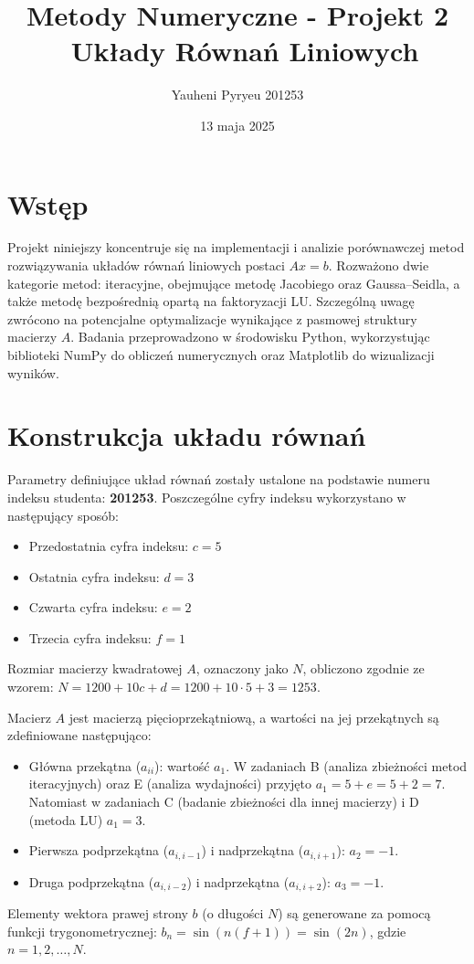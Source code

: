 \documentclass[a4paper, 11pt]{article}
\title{Metody Numeryczne - Projekt 2 \ Układy Równań Liniowych}
\author{Yauheni Pyryeu 201253}
\date{13 maja 2025}
\begin{document}
\maketitle

\section{Wstęp}
Projekt niniejszy koncentruje się na implementacji i analizie porównawczej metod rozwiązywania układów równań liniowych postaci $Ax = b$. Rozważono dwie kategorie metod: iteracyjne, obejmujące metodę Jacobiego oraz Gaussa–Seidla, a także metodę bezpośrednią opartą na faktoryzacji LU. Szczególną uwagę zwrócono na potencjalne optymalizacje wynikające z pasmowej struktury macierzy $A$. Badania przeprowadzono w środowisku Python, wykorzystując biblioteki NumPy do obliczeń numerycznych oraz Matplotlib do wizualizacji wyników.

\section{Konstrukcja układu równań}
Parametry definiujące układ równań zostały ustalone na podstawie numeru indeksu studenta: \textbf{201253}. Poszczególne cyfry indeksu wykorzystano w następujący sposób:
\begin{itemize}
    \item Przedostatnia cyfra indeksu: $c = 5$
    \item Ostatnia cyfra indeksu: $d = 3$
    \item Czwarta cyfra indeksu: $e = 2$
    \item Trzecia cyfra indeksu: $f = 1$
\end{itemize}
Rozmiar macierzy kwadratowej $A$, oznaczony jako $N$, obliczono zgodnie ze wzorem: $N = 1200 + 10c + d = 1200 + 10 \cdot 5 + 3 = 1253$.

Macierz $A$ jest macierzą pięcioprzekątniową, a wartości na jej przekątnych są zdefiniowane następująco:
\begin{itemize}
    \item Główna przekątna ($a_{ii}$): wartość $a_1$. W zadaniach B (analiza zbieżności metod iteracyjnych) oraz E (analiza wydajności) przyjęto $a_1 = 5 + e = 5 + 2 = 7$. Natomiast w zadaniach C (badanie zbieżności dla innej macierzy) i D (metoda LU) $a_1 = 3$.
    \item Pierwsza podprzekątna ($a_{i, i-1}$) i nadprzekątna ($a_{i, i+1}$): $a_2 = -1$.
    \item Druga podprzekątna ($a_{i, i-2}$) i nadprzekątna ($a_{i, i+2}$): $a_3 = -1$.
\end{itemize}
Elementy wektora prawej strony $b$ (o długości $N$) są generowane za pomocą funkcji trygonometrycznej: $b_n = \sin(n(f+1)) = \sin(2n)$, gdzie $n = 1, 2, \dots, N$.
\end{document}
